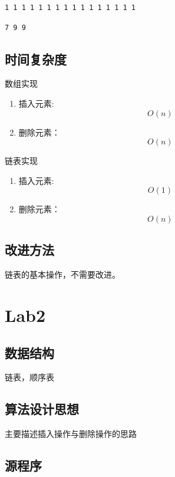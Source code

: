 \documentclass[a4paper,11pt,UTF8]{ctexart}
\begin{document}
\begin{lstlisting}[caption=4CSP.cpp,captionpos=b]
    1 1 1 1 1 1 1 1 1 1 1 1 1 1 1 1
\end{lstlisting}

\begin{lstlisting}[caption=5CSP.cpp,captionpos=b]
    7 9 9
\end{lstlisting}

\subsection{时间复杂度}

数组实现\par
\begin{enumerate}
    \item 插入元素: $$O(n)$$
    \item 删除元素：$$O(n)$$
\end{enumerate}\par

链表实现\par

\begin{enumerate}
    \item 插入元素: $$O(1)$$
    \item 删除元素：$$O(n)$$
\end{enumerate}\par

\subsection{改进方法}
链表的基本操作，不需要改进。



\section{Lab2}
\subsection{数据结构}
链表，顺序表
\subsection{算法设计思想}
主要描述插入操作与删除操作的思路
\subsection{源程序}
\end{document}
